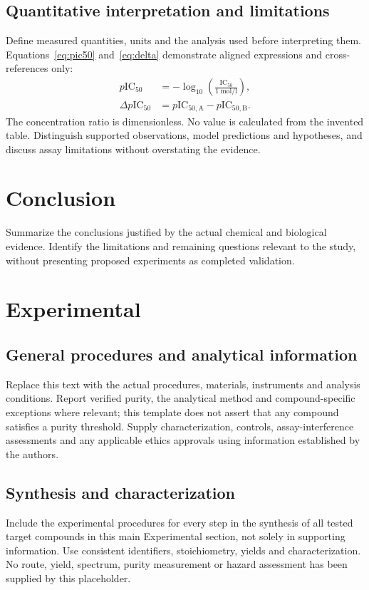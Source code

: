 \documentclass[letterpaper,12pt]{article}
\begin{document}
\subsection{Quantitative interpretation and limitations}
Define measured quantities, units and the analysis used before interpreting
them. Equations~\eqref{eq:pic50} and~\eqref{eq:delta} demonstrate aligned
expressions and cross-references only:
\begin{align}
 p\mathrm{IC}_{50} &= -\log_{10}\!\left(
 \frac{\mathrm{IC}_{50}}{\qty{1}{\mole\per\litre}}\right),\label{eq:pic50}\\
 \Delta p\mathrm{IC}_{50} &= p\mathrm{IC}_{50,\mathrm{A}}
                         -p\mathrm{IC}_{50,\mathrm{B}}.\label{eq:delta}
\end{align}
The concentration ratio is dimensionless. No value is calculated from the
invented table. Distinguish supported observations, model predictions and
hypotheses, and discuss assay limitations without overstating the evidence.

\section{Conclusion}
Summarize the conclusions justified by the actual chemical and biological
evidence. Identify the limitations and remaining questions relevant to the
study, without presenting proposed experiments as completed validation.

\section{Experimental}
\subsection{General procedures and analytical information}
Replace this text with the actual procedures, materials, instruments and
analysis conditions. Report verified purity, the analytical method and
compound-specific exceptions where relevant; this template does not assert
that any compound satisfies a purity threshold. Supply characterization,
controls, assay-interference assessments and any applicable ethics approvals
using information established by the authors.

\subsection{Synthesis and characterization}
Include the experimental procedures for every step in the synthesis of all
tested target compounds in this main Experimental section, not solely in
supporting information. Use consistent identifiers, stoichiometry, yields
and characterization. No route, yield, spectrum, purity measurement or
hazard assessment has been supplied by this placeholder.
\end{document}
